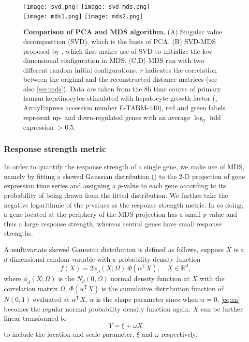 \begin{figure}[!ht]
\centering
\texttt{[image: svd.png]}
\texttt{[image: svd-mds.png]}\\
\texttt{[image: mds1.png]}
\texttt{[image: mds2.png]}
\caption[Performance of the MDS algorithm]{
{\bf Comparison of PCA and MDS algorithm.}
(A) Singular 
value decomposition (SVD), which is the basis of PCA. (B) SVD-MDS
proposed by \citealp{Becavin2011}, which first makes use of
SVD to initialize the low-dimensional configuration in MDS.
(C,D) MDS run with two different random initial 
configurations. $r$ indicates the correlation between the
original and the reconstructed distance matrices (see also
\ref{sec:mds}). 
Data are taken from the 8h time course of primary human keratinocytes 
stimulated with hepatocyte growth factor (\cite{Busch2008}, 
ArrayExpress accession number E-TABM-440),
red and green labels represent up- and 
down-regulated genes with an average $\log_2$ fold expression 
$> 0.5$. }
\label{fig:svd-mds}
\end{figure}

\subsubsection{Response strength metric}
\label{sec:response_strength}
In order to quantify the response strength of a single gene, we make use of 
MDS, namely by fitting a skewed Gaussian distribution (\citealp{Azzalini2003}) 
to the 2-D projection
of gene expression time series and assigning a $p$-value to each
gene according to its probability of being drawn from the fitted distribution.
We further take the negative logarithmic of the $p$-values as the response
strength metric. In so doing, a gene located at the periphery of the MDS
projection has a small $p$-value and thus a large response strength, whereas
central genes have small response strengths.

A multivariate skewed Gaussian distribution is defined as follows, suppose
$X$ is a $d$-dimensional random variable with a probability density function
\begin{equation}
f(X) = 2 \phi_d (X;\Omega) \ \Phi(\alpha^{\mathrm{T}} X), \quad X \in \mathbb{R}^d,
\label{eq:sn}
\end{equation}
where $\phi_d(X;\Omega)$ is the $N_d(0,\Omega)$ normal density function at $X$
with the correlation matrix $\Omega$, $\Phi(\alpha^{\mathrm{T}} X)$ is the 
cumulative distribution function of $N(0,1)$ evaluated at $\alpha^{\mathrm{T}} X$.
$\alpha$ is the shape parameter since when $\alpha=0$, \ref{eq:sn} becomes
the regular normal probability density function again. $X$ can be further
linear transformed to
\[
Y = \xi + \omega X
\]
to include the location and scale parameter, $\xi$ and $\omega$ respectively.

